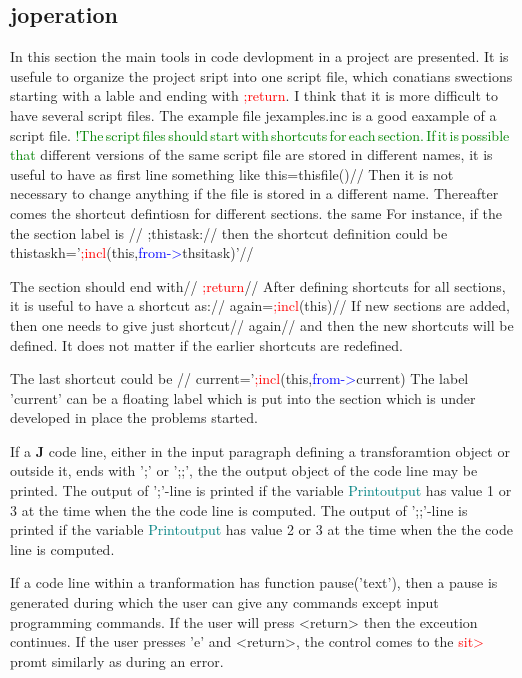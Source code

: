 \subsection{ joperation}
\label{joperation}
In this section the main tools in code devlopment in a project are presented. It is usefule to organize
the project sript into one script file, which conatians swections starting with a lable and ending
with \textcolor{Red}{;return}.
I think that it is more difficult to have several script files.
The example file jexamples.inc is a good eaxample of a script file.
\textcolor{green}{!The\,script\,files\,should\,start\,with\,shortcuts\,for\,each\,section.\,If\,it\,is\,possible\,that}
different versions of the same script file are stored in different names, it is useful to have
as first line something like
this=\textcolor{VioletRed}{thisfile}()//
Then it is not necessary to change anything if the file is stored in a different name.
Thereafter comes the shortcut defintiosn for different sections.
the same
For instance, if the the section
label is //
;thistask://
then the shortcut definition could be
thistaskh='\textcolor{Red}{;incl}(this,\textcolor{blue}{from->}thsitask)'//

The section should end with//
\textcolor{Red}{;return}//
After defining shortcuts for all sections, it is useful to have a shortcut as://
again=\textcolor{Red}{;incl}(this)//
If new sections are added, then one needs to give just shortcut//
again//
and then the new shortcuts will be defined. It does not matter if the earlier shortcuts are redefined.

The last shortcut could be //
current='\textcolor{Red}{;incl}(this,\textcolor{blue}{from->}current)
The label 'current' can be a floating label which is put into the section which is under developed
in place the problems started.

If a \textbf{J} code line, either in the input paragraph defining a transforamtion object
or outside it, ends with ';' or ';;', the the output object of the code line may be printed.
The output of ';'-line is printed if the variable \textcolor{teal}{Printoutput} has value 1 or 3 at the time when the the
code line is computed.
The output of ';;'-line is printed if the variable \textcolor{teal}{Printoutput} has value 2 or 3 at the time when the the
code line is computed.

If a code line within a tranformation has function \textcolor{VioletRed}{pause}('text'), then a pause is generated during which
the user can give any commands except
input programming commands. If the user will press <return> then the exceution continues. If the user
presses 'e' and <return>, the control comes to the \textcolor{Red}{sit>} promt similarly as during an error.

